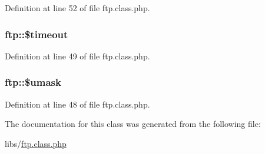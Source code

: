 Definition at line 52 of file ftp.\+class.\+php.

\hypertarget{classftp_a219848d21bf555048933e205c270b530}{}
\subsubsection[{\$timeout}]{\setlength{\rightskip}{0pt plus 5cm}ftp\+::\$timeout}\label{classftp_a219848d21bf555048933e205c270b530}


Definition at line 49 of file ftp.\+class.\+php.

\hypertarget{classftp_a40322387fc5aa5074daf7aaa4b7aa742}{}
\subsubsection[{\$umask}]{\setlength{\rightskip}{0pt plus 5cm}ftp\+::\$umask}\label{classftp_a40322387fc5aa5074daf7aaa4b7aa742}


Definition at line 48 of file ftp.\+class.\+php.



The documentation for this class was generated from the following file\+:\begin{DoxyCompactItemize}
\item 
libs/\hyperlink{ftp_8class_8php}{ftp.\+class.\+php}\end{DoxyCompactItemize}
